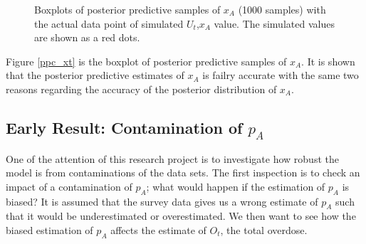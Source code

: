 \documentclass[]{article}
\begin{document}
\begin{figure}[htb]
	\centering
	\caption[two early result box plots:]{Boxplots of posterior predictive samples of $x_A$ (1000 samples) with the actual data point of simulated $U_t$,$x_A$ value. The simulated values are shown as a red dots.}
	
\end{figure}

Figure \ref{ppc_xt} is the boxplot of posterior predictive samples of $x_A$. It is shown that the posterior predictive estimates of $x_A$ is failry accurate with the same two reasons regarding the accuracy of the posterior distribution of $x_A$.\\



\subsection{Early Result: Contamination of $p_A$ } 
One of the attention of this research project is to investigate how robust the model is from contaminations of the data sets. The first inspection is to check an impact of a contamination of $p_A$; what would happen if the estimation of $p_A$ is biased? It is assumed that the survey data gives us a wrong estimate of $p_A$ such that it would be underestimated or overestimated. We then want to see how the biased estimation of $p_A$ affects the estimate of $O_t$, the total overdose.\\
\end{document}
